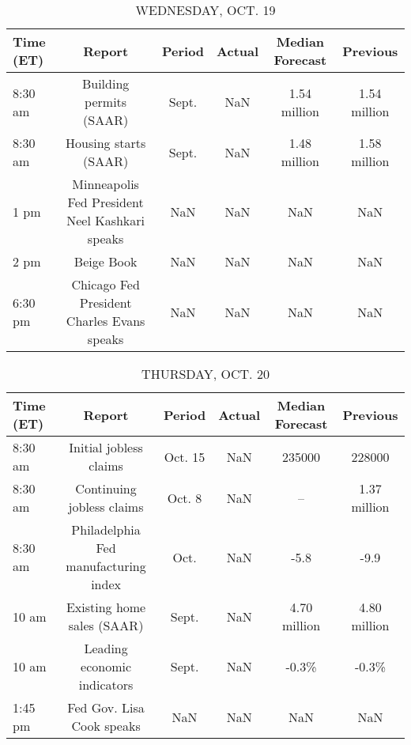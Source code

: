 \documentclass{article}%
\begin{document}
\begin{table}[htbp]%
\caption{WEDNESDAY, OCT. 19}%
\centering%
\begin{adjustbox}{width=1\textwidth}%
\begin{tabular}{lccccc}
\toprule
Time (ET) &                                         Report & Period & Actual & Median Forecast &     Previous \\
\midrule
  8:30 am &                        Building permits (SAAR) &  Sept. &    NaN &    1.54 million & 1.54 million \\
  8:30 am &                          Housing starts (SAAR) &  Sept. &    NaN &    1.48 million & 1.58 million \\
     1 pm & Minneapolis Fed President Neel Kashkari speaks &    NaN &    NaN &             NaN &          NaN \\
     2 pm &                                     Beige Book &    NaN &    NaN &             NaN &          NaN \\
  6:30 pm &     Chicago Fed President Charles Evans speaks &    NaN &    NaN &             NaN &          NaN \\
\bottomrule
\end{tabular}
%
\end{adjustbox}%
\end{table}

%


\begin{table}[htbp]%
\caption{THURSDAY, OCT. 20}%
\centering%
\begin{adjustbox}{width=1\textwidth}%
\begin{tabular}{lccccc}
\toprule
Time (ET) &                               Report &  Period & Actual & Median Forecast &     Previous \\
\midrule
  8:30 am &               Initial jobless claims & Oct. 15 &    NaN &          235000 &       228000 \\
  8:30 am &            Continuing jobless claims &  Oct. 8 &    NaN &              -- & 1.37 million \\
  8:30 am & Philadelphia Fed manufacturing index &    Oct. &    NaN &            -5.8 &         -9.9 \\
    10 am &           Existing home sales (SAAR) &   Sept. &    NaN &    4.70 million & 4.80 million \\
    10 am &          Leading economic indicators &   Sept. &    NaN &           -0.3\% &        -0.3\% \\
  1:45 pm &            Fed Gov. Lisa Cook speaks &     NaN &    NaN &             NaN &          NaN \\
\bottomrule
\end{tabular}
%
\end{adjustbox}%
\end{table}
\end{document}
